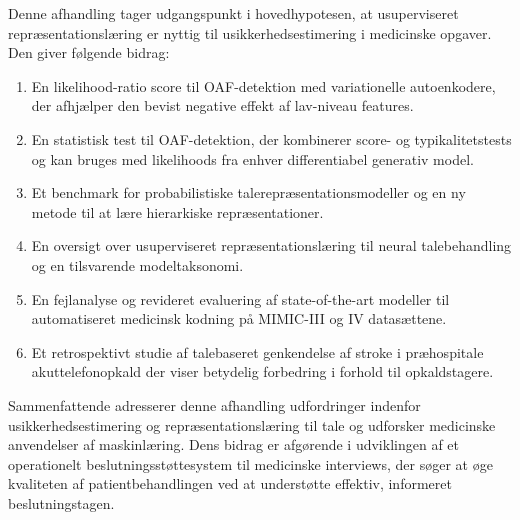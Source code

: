 Denne afhandling tager udgangspunkt i hovedhypotesen, at usuperviseret repræsentationslæring er nyttig til usikkerhedsestimering i medicinske opgaver.
Den giver følgende bidrag:
%
\begin{enumerate}[topsep=3pt, partopsep=0pt, itemsep=3pt, parsep=0pt, leftmargin=2em, label=(\alph*)] %
    \item En likelihood-ratio score til OAF-detektion med variationelle autoenkodere, der afhjælper den bevist negative effekt af lav-niveau features.
    \item En statistisk test til OAF-detektion, der kombinerer score- og typikalitetstests og kan bruges med likelihoods fra enhver differentiabel generativ model.
    \item Et benchmark for probabilistiske talerepræsentationsmodeller og en ny metode til at lære hierarkiske repræsentationer.
    \item En oversigt over usuperviseret repræsentationslæring til neural talebehandling og en tilsvarende modeltaksonomi.
    \item En fejlanalyse og revideret evaluering af state-of-the-art modeller til automatiseret medicinsk kodning på MIMIC-III og IV datasættene.
    \item Et retrospektivt studie af talebaseret genkendelse af stroke i præhospitale akuttelefonopkald der viser betydelig forbedring i forhold til opkaldstagere.
\end{enumerate}
%
Sammenfattende adresserer denne afhandling udfordringer indenfor usikkerhedsestimering og repræsentationslæring til tale og udforsker medicinske anvendelser af maskinlæring. 
Dens bidrag er afgørende i udviklingen af et operationelt beslutningsstøttesystem til medicinske interviews, der søger at øge kvaliteten af patientbehandlingen ved at understøtte effektiv, informeret beslutningstagen.
